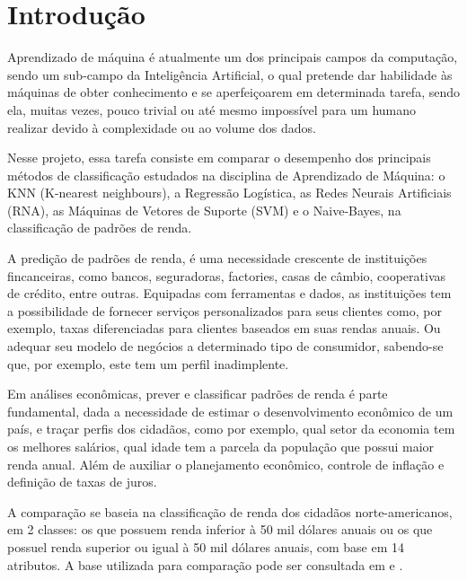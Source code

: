 \section{Introdução}
Aprendizado de máquina é atualmente um dos principais campos da computação, sendo um sub-campo da Inteligência Artificial, o qual pretende dar habilidade às máquinas de obter conhecimento e se aperfeiçoarem em determinada tarefa, sendo ela, muitas vezes, pouco trivial ou até mesmo impossível para um humano realizar devido à complexidade ou ao volume dos dados.

Nesse projeto, essa tarefa consiste em comparar o desempenho dos principais métodos de classificação estudados na disciplina de Aprendizado de Máquina: o KNN (K-nearest neighbours), a Regressão Logística, as Redes Neurais Artificiais (RNA), as Máquinas de Vetores de Suporte (SVM) e o Naive-Bayes, na classificação de padrões de renda. \cite{trabalho}

A predição de padrões de renda, é uma necessidade crescente de instituições fincanceiras, como bancos, seguradoras, factories, casas de câmbio, cooperativas de crédito, entre outras. Equipadas com ferramentas e dados, as instituições tem a possibilidade de fornecer serviços personalizados para seus clientes como, por exemplo, taxas diferenciadas para clientes baseados em suas rendas anuais. Ou adequar seu modelo de negócios a determinado tipo de consumidor, sabendo-se que, por exemplo, este tem um perfil inadimplente.\cite{importance}

Em análises econômicas, prever e classificar padrões de renda é parte fundamental, dada a necessidade de estimar o desenvolvimento econômico de um país, e traçar perfis dos cidadãos, como por exemplo, qual setor da economia tem os melhores salários, qual idade tem a parcela da população que possui maior renda anual. Além de auxiliar o planejamento econômico, controle de inflação e definição de taxas de juros.\cite{importance2}

A comparação se baseia na classificação de renda dos cidadãos norte-americanos, em 2 classes: os que possuem renda inferior à 50 mil dólares anuais ou os que possuel renda superior ou igual à 50 mil dólares anuais, com base em 14 atributos. A base utilizada para comparação pode ser consultada em \cite{base} e \cite{base2}.